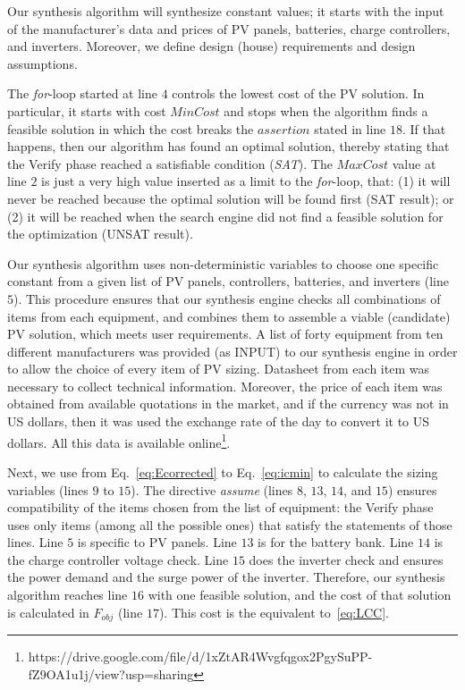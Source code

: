 \documentclass[runningheads]{llncs}
\begin{document}
Our synthesis algorithm will synthesize constant values; 
it starts with the input of the manufacturer's data and prices of PV panels, batteries, charge controllers, and inverters. Moreover, we define design (house) requirements and design assumptions. 

The \textit{for}-loop started at line $4$ controls the lowest cost of the PV solution. In particular, it starts with cost $MinCost$ and stops when the algorithm finds a feasible solution in which the cost breaks the $assertion$ stated in line $18$. If that happens, then our algorithm has found an optimal solution, thereby stating that the {\sc Verify} phase reached a satisfiable condition (\textit{SAT}). The $MaxCost$ value at line $2$ is just a very high value inserted as a limit to the \textit{for}-loop, that: (1) it will never be reached because the optimal solution will be found first (SAT result); or (2) it will be reached when the search engine did not find a feasible solution for the optimization (UNSAT result).

Our synthesis algorithm uses non-deterministic variables to choose one specific constant from a given list of PV panels, controllers, batteries, and inverters (line $5$). This procedure ensures that our synthesis engine checks all combinations of items from each equipment, and combines them to assemble a viable (candidate) PV solution, which meets user requirements. A list of forty equipment from ten different manufacturers was provided (as INPUT) to our synthesis engine in order to allow the choice of every item of PV sizing. Datasheet from each item was necessary to collect technical information. Moreover, the price of each item was obtained from available quotations in the market, and if the currency was not in US dollars, then it was used the exchange rate of the day to convert it to US dollars. All this data is available online\footnote{https://drive.google.com/file/d/1xZtAR4Wvgfqgox2PgySuPP-fZ9OA1u1j/view?usp=sharing}.

Next, we use from Eq.~\eqref{eq:Ecorrected} to Eq.~\eqref{eq:icmin} to calculate the sizing variables (lines $9$ to $15$). The directive \textit{assume} (lines $8$, $13$, $14$, and $15$) ensures compatibility of the items chosen from the list of equipment: the {\sc Verify} phase uses only items (among all the possible ones) that satisfy the statements of those lines. Line $5$ is specific to PV panels. Line $13$ is for the battery bank. Line $14$ is the charge controller voltage check. Line $15$ does the inverter check and ensures the power demand and the surge power of the inverter.
Therefore, our synthesis algorithm reaches line $16$ with one feasible solution, and the cost of that solution is calculated in $F_{obj}$ (line $17$). This cost is the equivalent to~\ref{eq:LCC}.
\end{document}
